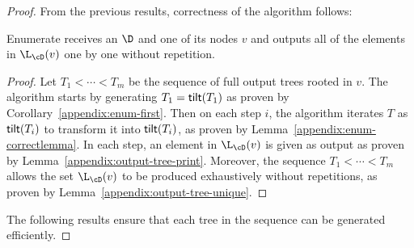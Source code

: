\begin{proof}
	From the previous results, correctness of the algorithm follows:
	
	\begin{claim}
		{\sc Enumerate} receives an \dsabbr $\D$ and one of its nodes $v$ and outputs all of the elements in $\L_{\cD}(v)$ one by one without repetition.
	\end{claim}
	\begin{proof}
		Let $T_1 <\cdots <T_m$ be the sequence of full output trees rooted in $v$. The algorithm starts by generating $T_1 = {\sf tilt}(T_1)$ as proven by Corollary~\ref{appendix:enum-first}. Then on each step $i$, the algorithm iterates $T$ as ${\sf tilt}(T_i)$ to transform it into ${\sf tilt}(T_i)$, as proven by Lemma~\ref{appendix:enum-correctlemma}. In each step, an element in $\L_{\cD}(v)$ is given as output as proven by Lemma~\ref{appendix:output-tree-print}. Moreover, the sequence $T_1 <\cdots <T_m$ allows the set $\L_{\cD}(v)$ to be produced exhaustively without repetitions, as proven by Lemma~\ref{appendix:output-tree-unique}.
	\end{proof}
	
	The following results ensure that each tree in the sequence can be generated efficiently.
	

\end{proof}
